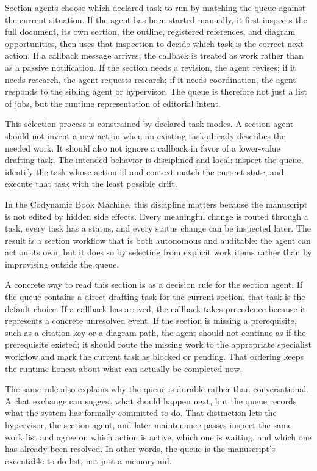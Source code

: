 \documentclass[11pt]{article}
\begin{document}
Section agents choose which declared task to run by matching the queue against the current situation. If the agent has been started manually, it first inspects the full document, its own section, the outline, registered references, and diagram opportunities, then uses that inspection to decide which task is the correct next action. If a callback message arrives, the callback is treated as work rather than as a passive notification. If the section needs a revision, the agent revises; if it needs research, the agent requests research; if it needs coordination, the agent responds to the sibling agent or hypervisor. The queue is therefore not just a list of jobs, but the runtime representation of editorial intent.

This selection process is constrained by declared task modes. A section agent should not invent a new action when an existing task already describes the needed work. It should also not ignore a callback in favor of a lower-value drafting task. The intended behavior is disciplined and local: inspect the queue, identify the task whose action id and context match the current state, and execute that task with the least possible drift.

In the Codynamic Book Machine, this discipline matters because the manuscript is not edited by hidden side effects. Every meaningful change is routed through a task, every task has a status, and every status change can be inspected later. The result is a section workflow that is both autonomous and auditable: the agent can act on its own, but it does so by selecting from explicit work items rather than by improvising outside the queue.

A concrete way to read this section is as a decision rule for the section agent. If the queue contains a direct drafting task for the current section, that task is the default choice. If a callback has arrived, the callback takes precedence because it represents a concrete unresolved event. If the section is missing a prerequisite, such as a citation key or a diagram path, the agent should not continue as if the prerequisite existed; it should route the missing work to the appropriate specialist workflow and mark the current task as blocked or pending. That ordering keeps the runtime honest about what can actually be completed now.

The same rule also explains why the queue is durable rather than conversational. A chat exchange can suggest what should happen next, but the queue records what the system has formally committed to do. That distinction lets the hypervisor, the section agent, and later maintenance passes inspect the same work list and agree on which action is active, which one is waiting, and which one has already been resolved. In other words, the queue is the manuscript's executable to-do list, not just a memory aid.
\end{document}
